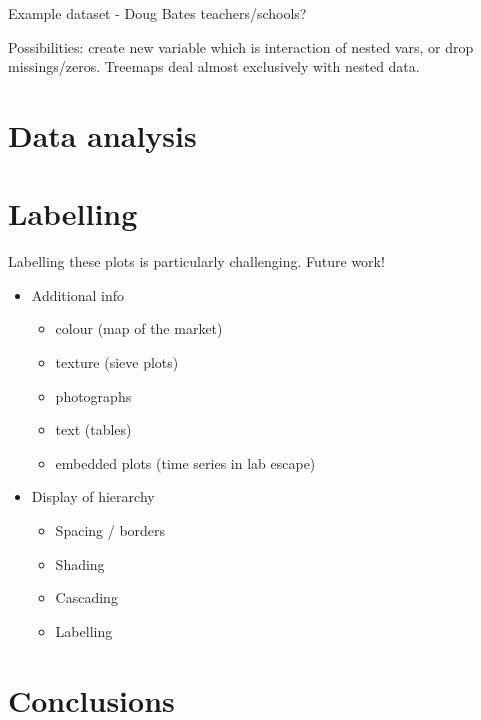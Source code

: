 \documentclass[letterpaper,oneside]{scrartcl}
\begin{document}
Example dataset - Doug Bates teachers/schools?

Possibilities: create new variable which is interaction of nested vars, or drop missings/zeros.  Treemaps deal almost exclusively with nested data.

\section{Data analysis} %
\label{sec:data_analysis}


\section{Labelling}
\label{sec:legends}

Labelling these plots is particularly challenging.  Future work!

\begin{itemize}
  \item Additional info 
  \begin{itemize}
    \item colour (map of the market)
    \item texture (sieve plots)
    \item photographs
    \item text (tables)
    \item embedded plots (time series in lab escape)
  \end{itemize}
  
  \item Display of hierarchy
  \begin{itemize}
    \item Spacing / borders
    \item Shading
    \item Cascading
    \item Labelling
  \end{itemize}
\end{itemize}

\section{Conclusions} %
\label{sec:conclusions}



\end{document}
